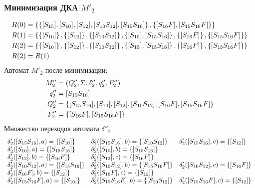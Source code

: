 \subsubsection{Минимизация ДКА \(M'_2\)}
\begin{align*}
	R(0) & = \left\{\left\{[S_{15}],[S_{10}], [S_{12}], [S_{10}S_{12}], [S_{15}S_{16}]\right\}, \left\{[S_{16}F], [S_{15}S_{16}F]\right\}\right\}                            \\
	R(1) & = \left\{\left\{[S_{10}]\right\}, \left\{[S_{12}]\right\}, \left\{[S_{10}S_{12}]\right\}, \left\{[S_{15}],  [S_{15}S_{16}]\right\}, \left\{[S_{16}F]\right\}, \left\{ [S_{15}S_{16}F]\right\}\right\} \\
	R(2) & = \left\{\left\{[S_{10}]\right\}, \left\{[S_{12}]\right\}, \left\{[S_{10}S_{12}]\right\}, \left\{[S_{15}],  [S_{15}S_{16}]\right\}, \left\{[S_{16}F]\right\}, \left\{ [S_{15}S_{16}F]\right\}\right\} \\
	R(2) & = R(1)
\end{align*}
Автомат \(M'_2\) после минимизации:
\begin{align*}
	M''_2 & = \left(Q''_2, \Sigma, \delta''_2, q''_2, F''_2\right)                                       \\
	q''_2 & = [S_{15}S_{16}]                                                                      \\
	Q''_2 & = \left\{[S_{15}S_{16}],[S_{10}], [S_{12}], [S_{10}S_{12}], [S_{16}F], [S_{15}S_{16}F]\right\} \\
	F''_2 & = \left\{[S_{16}F], [S_{15}S_{16}F]\right\}
\end{align*}
Множество переходов автомата \(\delta''_2\)
\begin{align*}
	\begin{array}{lll}
		\delta'_2([S_{15}S_{16}], a) = \left\{[S_{10}]\right\}       & \delta'_2([S_{15}S_{16}], b) = \left\{[S_{10}S_{12}]\right\}  & \delta'_2([S_{15}S_{16}], c) = \left\{[S_{12}]\right\}  \\
		\delta'_2([S_{10}], a) = \left\{[S_{15}S_{16}]\right\}       & \delta'_2([S_{10}], b) = \left\{[S_{15}S_{16}]\right\}                                                         \\
		\delta'_2([S_{12}], b) = \left\{[S_{16}F]\right\}            & \delta'_2([S_{12}], c) = \left\{[S_{16}F]\right\}                                                              \\
		\delta'_2([S_{10}S_{12}], a) = \left\{[S_{15}S_{16}]\right\} & \delta'_2([S_{10}S_{12}], b) = \left\{[S_{15}S_{16}F]\right\} & \delta'_2([S_{10}S_{12}], c) = \left\{[S_{16}F]\right\} \\
		\delta'_2([S_{16}F], b) = \left\{[S_{12}]\right\}            & \delta'_2([S_{16}F], c) = \left\{[S_{12}]\right\}                                                              \\
		\delta'_2([S_{15}S_{16}F], a) = \left\{[S_{10}]\right\}      & \delta'_2([S_{15}S_{16}F], b) = \left\{[S_{10}S_{12}]\right\} & \delta'_2([S_{15}S_{16}F], c) = \left\{[S_{12}]\right\} \\
	\end{array}
\end{align*}
